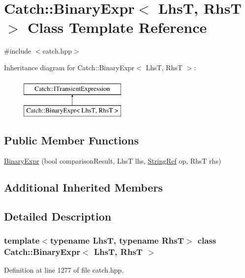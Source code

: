 \hypertarget{class_catch_1_1_binary_expr}{}\section{Catch\+:\+:Binary\+Expr$<$ LhsT, RhsT $>$ Class Template Reference}
\label{class_catch_1_1_binary_expr}


{\ttfamily \#include $<$catch.\+hpp$>$}

Inheritance diagram for Catch\+:\+:Binary\+Expr$<$ LhsT, RhsT $>$\+:\begin{figure}[H]
\begin{center}
\leavevmode
\includegraphics[height=2.000000cm]{class_catch_1_1_binary_expr}
\end{center}
\end{figure}
\subsection*{Public Member Functions}
\begin{DoxyCompactItemize}
\item 
\mbox{\hyperlink{class_catch_1_1_binary_expr_a657d66346aef97a760c22776fe6008b6}{Binary\+Expr}} (bool comparison\+Result, LhsT lhs, \mbox{\hyperlink{class_catch_1_1_string_ref}{String\+Ref}} op, RhsT rhs)
\end{DoxyCompactItemize}
\subsection*{Additional Inherited Members}


\subsection{Detailed Description}
\subsubsection*{template$<$typename LhsT, typename RhsT$>$\newline
class Catch\+::\+Binary\+Expr$<$ Lhs\+T, Rhs\+T $>$}



Definition at line 1277 of file catch.\+hpp.



